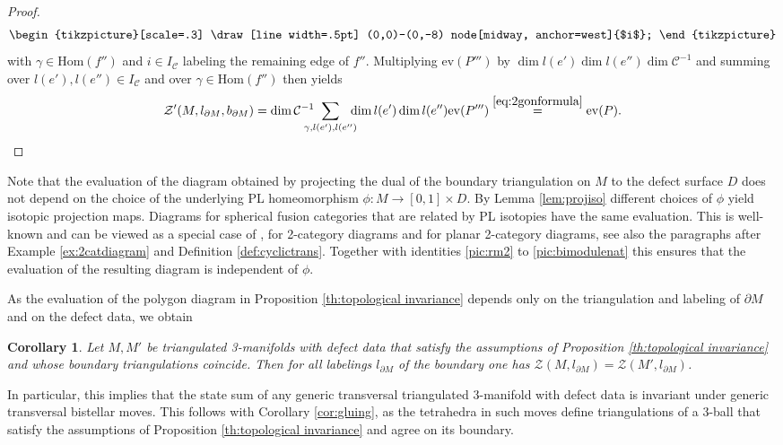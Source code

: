 \documentclass[1.5pt, a4paper]{article}
\newcommand{\mac}{\mathcal C}
\newcommand{\Hom}{\mathrm{Hom}}
\newcommand{\ev}{\mathrm{ev}}
\newcommand{\inv}[0]{{-1}}
\newtheorem{corollary}[theorem]{Corollary}
\begin{document}
\begin{proof}
\begin{align}
\begin{tikzpicture}[scale=.3]
\draw[line width=.5pt] (0,0)--(0,-8) node[midway, anchor=west]{$i$};
\end{tikzpicture}
\end{align}
with $\gamma\in \Hom(f'')$  and $i\in I_\mac$  labeling the remaining edge of $f''$.  Multiplying $\ev(P''')$ by $\dim l(e')\dim l(e'') \dim \mac^\inv$ and summing over $l(e'), l(e'')\in I_\mac$ and over  $\gamma\in \Hom(f'')$ then yields 
\begin{align*}
\mathcal Z'(M, l_{\partial M}, b_{\partial M})= \dim \mac^\inv \!\!\!\! \!\! \sum_{\gamma, l(e'), l(e'')} \!\!\!\!\!\!\ \dim l(e')\dim l(e'')\ev(P''')
\stackrel{\eqref{eq:2gonformula}}
=\ev(P).
\end{align*}
\end{proof}
 
Note that the evaluation of the diagram obtained by projecting the dual of the boundary triangulation on $M$ to the defect surface $D$ does not depend on the choice of the underlying PL homeomorphism $\phi: M\to [0,1]\times D$. By Lemma \ref{lem:projiso}  different choices of $\phi$ yield isotopic projection maps. Diagrams for spherical fusion categories that are related by PL isotopies have the same evaluation. This is well-known and  can be viewed as a special case of  \cite[Th.~1.12]{JS}, \cite[Th.~2.12]{BMS} for 2-category diagrams and \cite[Th.~3.9]{BMS}  for planar 2-category diagrams, see also the paragraphs after Example \ref{ex:2catdiagram} and Definition \ref{def:cyclictrans}. Together with identities \eqref{pic:rm2} to \eqref{pic:bimodulenat} this ensures that the evaluation of the resulting diagram is independent of $\phi$. 

As the evaluation of the polygon diagram in Proposition \ref{th:topological invariance} depends only on the  triangulation and labeling of $\partial M$ and on the defect data, we obtain

\begin{corollary} Let $M,M'$ be  triangulated 3-manifolds with defect data that satisfy the assumptions of Proposition \ref{th:topological invariance} and whose boundary triangulations coincide. Then for all labelings $l_{\partial M}$ of the boundary one has $\mathcal Z(M, l_{\partial M})=\mathcal Z(M', l_{\partial M})$.
\end{corollary}


In particular, this implies  that the state sum of any  generic transversal triangulated 3-manifold with defect data is invariant under generic transversal bistellar moves.  This follows with Corollary \ref{cor:gluing}, as the tetrahedra  in such moves define  triangulations  of a 3-ball
that satisfy the assumptions of Proposition \ref{th:topological invariance} and agree on its boundary.  
\end{document}
